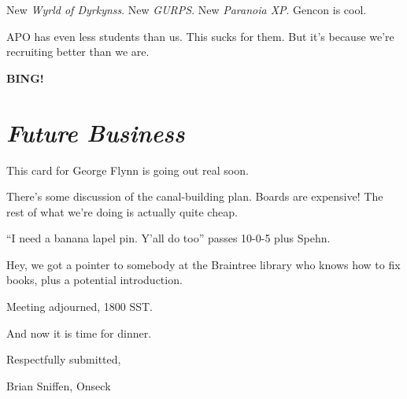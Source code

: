 \documentclass[10pt]{article}
\newcommand{\bing}{{\bf BING!} }
\newcommand{\goto}[1]{\bing \vskip 12pt \section*{{\em{#1}}}}
\newcommand{\ps}{ plus Spehn\xspace}
\begin{document}
New \emph{Wyrld of Dyrkynss}.  New \emph{GURPS}.  New \emph{Paranoia
  XP}.  Gencon is cool.

APO has even less students than us.  This sucks for them.  But it's
because we're recruiting better than we are.

\goto{Future Business}

This card for George Flynn is going out real soon.

There's some discussion of the canal-building plan.  Boards are
expensive!  The rest of what we're doing is actually quite cheap.

``I need a banana lapel pin.  Y'all do too''  passes 10-0-5\ps.

Hey, we got a pointer to somebody at the Braintree library who knows
how to fix books, plus a potential introduction.

\vspace{12pt}

\noindent
Meeting adjourned, 1800 SST.

And now it is time for dinner.

\vspace{18pt}

\centerline{Respectfully submitted,}
\centerline{Brian Sniffen, Onseck}
\end{document}
